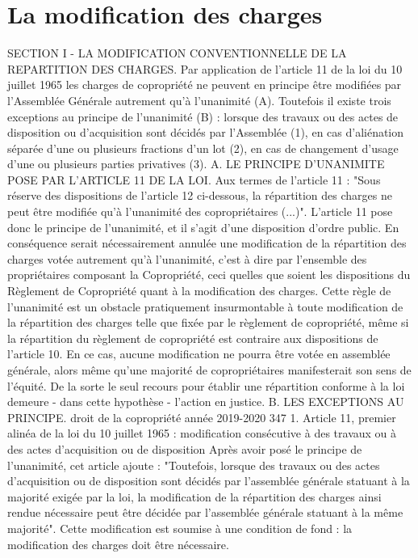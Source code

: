 \chapter{La modification des charges}

SECTION I - LA MODIFICATION CONVENTIONNELLE DE LA REPARTITION DES CHARGES.
Par application de l'article 11 de la loi du 10 juillet 1965 les charges de copropriété ne peuvent en principe être modifiées par l'Assemblée Générale autrement qu'à l'unanimité (A). Toutefois il existe trois exceptions au principe de l'unanimité (B) : lorsque des travaux ou des actes de disposition ou d'acquisition sont décidés par l'Assemblée (1), en cas d'aliénation séparée d'une ou plusieurs fractions d'un lot (2), en cas de changement d'usage d'une ou plusieurs parties privatives (3).
A. LE PRINCIPE D'UNANIMITE POSE PAR L'ARTICLE 11 DE LA LOI.
Aux termes de l'article 11 :
"Sous réserve des dispositions de l'article 12 ci-dessous, la répartition des charges ne peut être modifiée qu'à l'unanimité des copropriétaires (...)".
L'article 11 pose donc le principe de l'unanimité, et il s'agit d'une disposition d'ordre public.
En conséquence serait nécessairement annulée une modification de la répartition des charges votée autrement qu'à l'unanimité, c'est à dire par l'ensemble des propriétaires composant la Copropriété, ceci quelles que soient les dispositions du Règlement de Copropriété quant à la modification des charges.
Cette règle de l'unanimité est un obstacle pratiquement insurmontable à toute modification de la répartition des charges telle que fixée par le règlement de copropriété, même si la répartition du règlement de copropriété est contraire aux dispositions de l'article 10. En ce cas, aucune modification ne pourra être votée en assemblée générale, alors même qu'une majorité de copropriétaires manifesterait son sens de l'équité. De la sorte le seul recours pour établir une répartition conforme à la loi demeure - dans cette hypothèse - l'action en justice.
B. LES EXCEPTIONS AU PRINCIPE.
droit de la copropriété année 2019-2020
347
1. Article 11, premier alinéa de la loi du 10 juillet 1965 : modification consécutive à des travaux ou à des actes d’acquisition ou de disposition
Après avoir posé le principe de l'unanimité, cet article ajoute :
"Toutefois, lorsque des travaux ou des actes d'acquisition ou de disposition sont décidés par l'assemblée générale statuant à la majorité exigée par la loi, la modification de la répartition des charges ainsi rendue nécessaire peut être décidée par l'assemblée générale statuant à la même majorité".
Cette modification est soumise à une condition de fond : la modification des charges doit être nécessaire.
